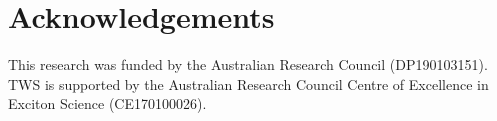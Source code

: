 \documentclass[journal=jacsat,manuscript=article,layout=onecolumn]{achemso}
\begin{document}
\section{Acknowledgements}
This research was funded by the Australian Research Council (DP190103151). TWS is supported by the Australian Research Council Centre of Excellence in Exciton Science (CE170100026).





\end{document}
